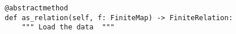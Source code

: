\begin{verbatim}
@abstractmethod
def as_relation(self, f: FiniteMap) -> FiniteRelation:
    """ Load the data  """
\end{verbatim}
